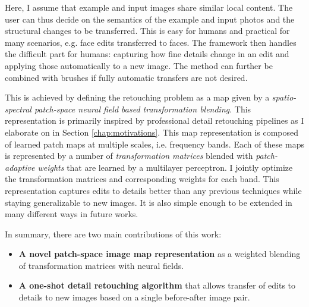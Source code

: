 Here, I assume that example and input images share similar local content. The user can thus decide on the semantics of the example and input photos and the structural changes to be transferred. This is easy for humans and practical for many scenarios, e.g. face edits transferred to faces. The framework then handles the difficult part for humans: capturing how fine details change in an edit and applying those automatically to a new image. The method can further be combined with brushes if fully automatic transfers are not desired. 

This is achieved by defining the retouching problem as a map given by a \emph{spatio-spectral patch-space neural field based transformation blending}. This representation is primarily inspired by professional detail retouching pipelines as I elaborate on in Section \ref{chap:motivations}. This map representation is composed of learned patch maps at multiple scales, i.e. frequency bands. Each of these maps is represented by a number of \emph{transformation matrices} blended with \emph{patch-adaptive weights} that are learned by a multilayer perceptron. I jointly optimize the transformation matrices and corresponding weights for each band. This representation captures edits to details better than any previous techniques while staying generalizable to new images. It is also simple enough to be extended in many different ways in future works.

In summary, there are two main contributions of this work: 

\begin{itemize}

    \item \textbf{A novel patch-space image map representation} as a weighted blending of transformation matrices with neural fields.
    
	\item \textbf{A one-shot detail retouching algorithm} that allows transfer of edits to details to new images based on a single before-after image pair.

\end{itemize}
